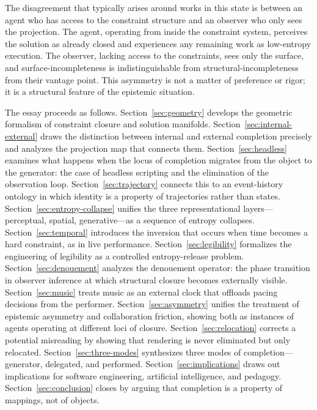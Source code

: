 \documentclass[12pt, twoside]{article}
\theoremstyle{plain}
\theoremstyle{definition}
\theoremstyle{remark}
\begin{document}
The disagreement that typically arises around works in this state is between an agent who has access to the constraint structure and an observer who only sees the projection. The agent, operating from inside the constraint system, perceives the solution as already closed and experiences any remaining work as low-entropy execution. The observer, lacking access to the constraints, sees only the surface, and surface-incompleteness is indistinguishable from structural-incompleteness from their vantage point. This asymmetry is not a matter of preference or rigor; it is a structural feature of the epistemic situation.

The essay proceeds as follows. Section~\ref{sec:geometry} develops the geometric formalism of constraint closure and solution manifolds. Section~\ref{sec:internal-external} draws the distinction between internal and external completion precisely and analyzes the projection map that connects them. Section~\ref{sec:headless} examines what happens when the locus of completion migrates from the object to the generator: the case of headless scripting and the elimination of the observation loop. Section~\ref{sec:trajectory} connects this to an event-history ontology in which identity is a property of trajectories rather than states. Section~\ref{sec:entropy-collapse} unifies the three representational layers---perceptual, spatial, generative---as a sequence of entropy collapses. Section~\ref{sec:temporal} introduces the inversion that occurs when time becomes a hard constraint, as in live performance. Section~\ref{sec:legibility} formalizes the engineering of legibility as a controlled entropy-release problem. Section~\ref{sec:denouement} analyzes the denouement operator: the phase transition in observer inference at which structural closure becomes externally visible. Section~\ref{sec:music} treats music as an external clock that offloads pacing decisions from the performer. Section~\ref{sec:asymmetry} unifies the treatment of epistemic asymmetry and collaboration friction, showing both as instances of agents operating at different loci of closure. Section~\ref{sec:relocation} corrects a potential misreading by showing that rendering is never eliminated but only relocated. Section~\ref{sec:three-modes} synthesizes three modes of completion---generator, delegated, and performed. Section~\ref{sec:implications} draws out implications for software engineering, artificial intelligence, and pedagogy. Section~\ref{sec:conclusion} closes by arguing that completion is a property of mappings, not of objects.
\end{document}
